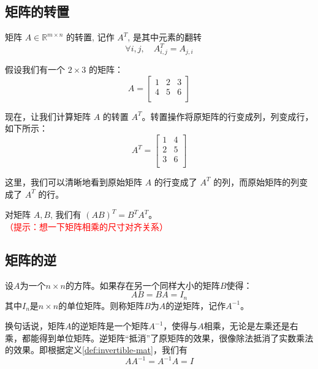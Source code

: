 
\subsection{矩阵的转置}

\begin{definition}
    
矩阵 $A \in \mathbb{R}^{m \times n}$ 的转置, 记作 $A^T$, 是其中元素的翻转
$$
\forall i, j, \quad A_{i, j}^T=A_{j, i}
$$
\end{definition}

\begin{exercise}
假设我们有一个 $2 \times 3$ 的矩阵：
$$
A = \begin{bmatrix}
1 & 2 & 3 \\
4 & 5 & 6 \\
\end{bmatrix}
$$

现在，让我们计算矩阵 $A$ 的转置 $A^T$。转置操作将原矩阵的行变成列，列变成行，如下所示：
$$
A^T = \begin{bmatrix}
1 & 4 \\
2 & 5 \\
3 & 6 \\
\end{bmatrix}
$$

这里，我们可以清晰地看到原始矩阵 $A$ 的行变成了 $A^T$ 的列，而原始矩阵的列变成了 $A^T$ 的行。
\end{exercise}

\begin{theorem}[转置运算的性质] \label{thm:transpose-property}
    对矩阵 $A, B$, 我们有 $(A B)^T=B^T A^T$。\textcolor{red}{（提示：想一下矩阵相乘的尺寸对齐关系）}
\end{theorem}

\subsection{矩阵的逆}

\begin{definition} \label{def:invertible-mat}
    设$A$为一个$n \times n$的方阵。如果存在另一个同样大小的矩阵$B$使得：
$$AB = BA = I_n$$
其中$I_n$是$n \times n$的单位矩阵。则称矩阵$B$为$A$的逆矩阵，记作$A^{-1}$。
\end{definition}

换句话说，矩阵$A$的逆矩阵是一个矩阵$A^{-1}$，使得与$A$相乘，无论是左乘还是右乘，都能得到单位矩阵。逆矩阵“抵消”了原矩阵的效果，很像除法抵消了实数乘法的效果。即根据定义\ref{def:invertible-mat}，我们有
$$
A A^{-1}=A^{-1} A=I
$$

